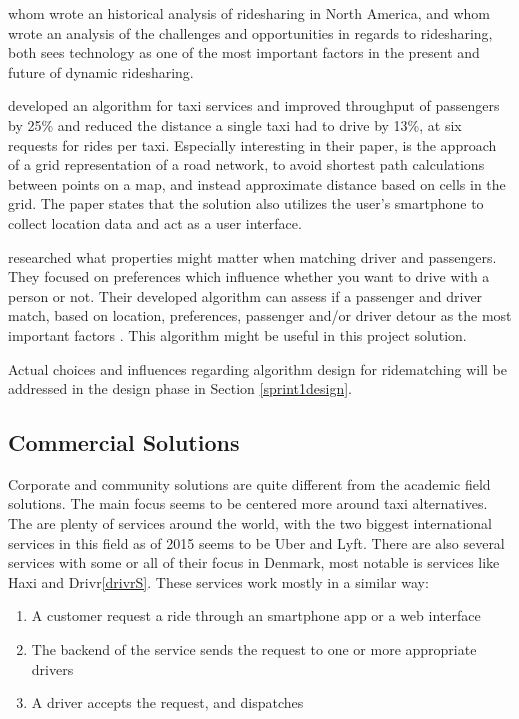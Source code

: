 \citet{doi:10.1080/01441647.2011.621557} whom wrote an historical analysis of ridesharing in North America, and \citet{amey2011real} whom wrote an analysis of the challenges and opportunities in regards to ridesharing, both sees technology as one of the most important factors in the present and future of dynamic ridesharing.

\citet{ShuoMa2013} developed an algorithm for taxi services and improved throughput of passengers by 25\% and reduced the distance a single taxi had to drive by 13\%, at six requests for rides per taxi.
Especially interesting in their paper, is the approach of a grid representation of a road network, to avoid shortest path calculations between points on a map, and instead approximate distance based on cells in the grid.
The paper states that the solution also utilizes the user's smartphone to collect location data and act as a user interface.

\citet{ghoseiri2011real} researched what properties might matter when matching driver and passengers.
They focused on preferences which influence whether you want to drive with a person or not.
Their developed algorithm can assess if a passenger and driver match, based on location, preferences, passenger and/or driver detour as the most important factors \cite{ghoseiri2011real}.
This algorithm might be useful in this project solution.

Actual choices and influences regarding algorithm design for ridematching will be addressed in the design phase in Section \ref{sprint1design}.

\subsection{Commercial Solutions}
Corporate and community solutions are quite different from the academic field solutions.
The main focus seems to be centered more around taxi alternatives.
The are plenty of services around the world, with the two biggest international services in this field as of 2015 seems to be Uber and Lyft\cite{ridehail}.
There are also several services with some or all of their focus in Denmark, most notable is services like Haxi and Drivr\ref{drivrS}.
These services work mostly in a similar way: 

\begin{enumerate}
	\item A customer request a ride through an smartphone app or a web interface
	\item The backend of the service sends the request to one or more appropriate drivers
	\item A driver accepts the request, and dispatches
\end{enumerate}

